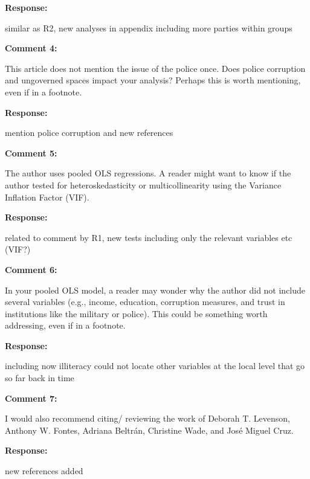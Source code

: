 \documentclass[12pt, a4paper, notitlepage]{article}
\begin{document}
\noindent\textbf{Response:} {}

similar as R2, new analyses in appendix including more parties within groups

\vspace{15pt}
\noindent\textbf{Comment 4:}
\begin{displayquote}
This article does not mention the issue of the police once. Does police corruption and ungoverned spaces impact your analysis? Perhaps this is worth mentioning, even if in a footnote.
\end{displayquote}

\noindent\textbf{Response:} {}

mention police corruption and new references

\vspace{15pt}
\noindent\textbf{Comment 5:}
\begin{displayquote}
The author uses pooled OLS regressions. A reader might want to know if the author tested for heteroskedasticity or multicollinearity using the Variance Inflation Factor (VIF).
\end{displayquote}

\noindent\textbf{Response:} {}

related to comment by R1, new tests including only the relevant variables etc (VIF?)

\vspace{15pt}
\noindent\textbf{Comment 6:}
\begin{displayquote}
In your pooled OLS model, a reader may wonder why the author did not include several variables (e.g., income, education, corruption measures, and trust in institutions like the military or police). This could be something worth addressing, even if in a footnote.
\end{displayquote}

\noindent\textbf{Response:} {}

including now illiteracy
could not locate other variables at the local level that go so far back in time

\vspace{15pt}
\noindent\textbf{Comment 7:}
\begin{displayquote}
I would also recommend citing/ reviewing the work of Deborah T. Levenson, Anthony W. Fontes, Adriana Beltrán, Christine Wade, and José Miguel Cruz.
\end{displayquote}

\noindent\textbf{Response:} {}

new references added
\end{document}
